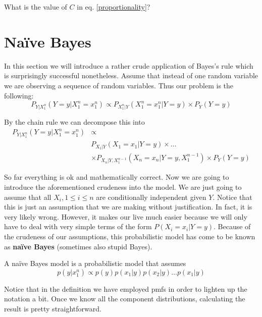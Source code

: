 \documentclass[a4paper,11pt,leqno]{report}
\begin{document}
\begin{Exercise}
What is the value of $ C $ in eq. \ref{proportionality}?
\end{Exercise}



\section{Na\"ive Bayes}
In this section we will introduce a rather crude application of Bayes's rule which is surprisingly successful nonetheless.
Assume that instead of one random variable we are observing a sequence of random variables. Thus our problem is the following:
\begin{equation}
P_{Y|X_{1}^{n}}(Y=y|X_{1}^{n}=x_{1}^{n}) \propto P_{X_{1}^{n}|Y}(X_{1}^{n}=x_{1}^{n}|Y=y) \times P_{Y}(Y=y) 
\end{equation}

By the chain rule we can decompose this into
\begin{align}
P_{Y|X_{1}^{n}}(Y=y|X_{1}^{n}=x_{1}^{n}) &\propto \\
&P_{X_{1}|Y}(X_{1}=x_{1}|Y=y) \times \ldots \nonumber \\
&\times P_{X_{n}|Y,X_{1}^{n-1}}(X_{n}=x_{n}|Y=y,X_{1}^{n-1}) \times P_{Y}(Y=y) \nonumber
\end{align}

So far everything is ok and mathematically correct. Now we are going to introduce the aforementioned crudeness into the model.
We are just going to assume that all $ X_{i}, 1 \leq i \leq n  $ are conditionally independent given $ Y $. Notice that
this is just an assumption that we are making without justification. In fact, it is very likely wrong. However, it makes our
live much easier because we will only have to deal with very simple terms of the form $ P(X_{i}=x_{i}|Y=y) $. Because of the
crudeness of our assumptions, this probabilistic model has come to be known as \textbf{na\"ive Bayes} (sometimes also 
stupid Bayes).

\begin{Definition}
A na\"ive Bayes model is a probabilistic model that assumes
$$ p(y|x_{1}^{n}) \propto p(y)p(x_{1}|y)p(x_{2}|y)\ldots p(x_{1}|y) $$
\end{Definition}

Notice that in the definition we have employed pmfs in order to lighten up the notation a bit. Once we know all the component
distributions, calculating the result is pretty straightforward. 
\end{document}
